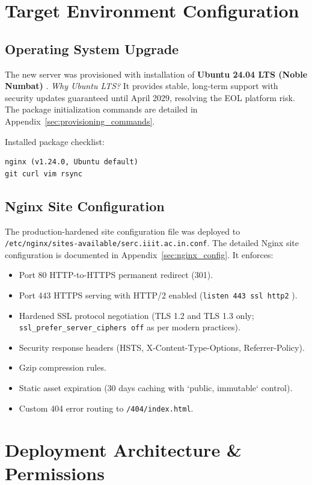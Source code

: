 \documentclass[11pt,a4paper,DIV=16,headings=normal,parskip=half]{scrartcl}
\begin{document}
\section{Target Environment Configuration}

\subsection{Operating System Upgrade}
The new server was provisioned with installation of \textbf{Ubuntu 24.04 LTS (Noble Numbat)} \cite{ubuntu-lts}.
\textit{Why Ubuntu LTS?} It provides stable, long-term support with security updates guaranteed until April 2029, resolving the EOL platform risk. The package initialization commands are detailed in Appendix~\ref{sec:provisioning_commands}.

Installed package checklist:
\begin{lstlisting}
nginx (v1.24.0, Ubuntu default)
git curl vim rsync
\end{lstlisting}

\subsection{Nginx Site Configuration}
The production-hardened site configuration file was deployed to \texttt{/etc/nginx/sites-available/serc.iiit.ac.in.conf}. The detailed Nginx site configuration is documented in Appendix~\ref{sec:nginx_config}. It enforces:
\begin{itemize}
\item Port 80 HTTP-to-HTTPS permanent redirect (301).
\item Port 443 HTTPS serving with HTTP/2 enabled (\texttt{listen 443 ssl http2} \cite{rfc7540}).
\item Hardened SSL protocol negotiation (TLS 1.2 \cite{rfc5246} and TLS 1.3 \cite{rfc8446} only; \texttt{ssl\_prefer\_server\_ciphers off} as per modern practices).
\item Security response headers \cite{owasp-headers} (HSTS, X-Content-Type-Options, Referrer-Policy).
\item Gzip compression rules.
\item Static asset expiration (30 days caching with `public, immutable` control).
\item Custom 404 error routing to \texttt{/404/index.html}.
\end{itemize}

\section{Deployment Architecture \& Permissions}
\end{document}
